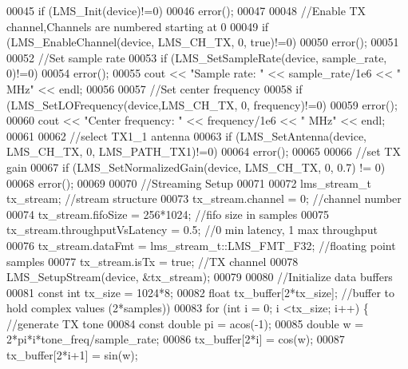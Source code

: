 \begin{DoxyCode}
00045     \textcolor{keywordflow}{if} (LMS_Init(device)!=0)
00046         error();
00047 
00048     \textcolor{comment}{//Enable TX channel,Channels are numbered starting at 0}
00049     \textcolor{keywordflow}{if} (LMS_EnableChannel(device, LMS_CH_TX, 0, \textcolor{keyword}{true})!=0)
00050         error();
00051 
00052     \textcolor{comment}{//Set sample rate}
00053     \textcolor{keywordflow}{if} (LMS_SetSampleRate(device, sample\_rate, 0)!=0)
00054         error();
00055     cout << \textcolor{stringliteral}{"Sample rate: "} << sample\_rate/1e6 << \textcolor{stringliteral}{" MHz"} << endl;
00056 
00057     \textcolor{comment}{//Set center frequency}
00058     \textcolor{keywordflow}{if} (LMS_SetLOFrequency(device,LMS_CH_TX, 0, frequency)!=0)
00059         error();
00060     cout << \textcolor{stringliteral}{"Center frequency: "} << frequency/1e6 << \textcolor{stringliteral}{" MHz"} << endl;
00061 
00062     \textcolor{comment}{//select TX1\_1 antenna}
00063     \textcolor{keywordflow}{if} (LMS_SetAntenna(device, LMS_CH_TX, 0, LMS_PATH_TX1)!=0)
00064         error();
00065 
00066     \textcolor{comment}{//set TX gain}
00067     \textcolor{keywordflow}{if} (LMS_SetNormalizedGain(device, LMS_CH_TX, 0, 0.7) != 0)
00068         error();
00069 
00070     \textcolor{comment}{//Streaming Setup}
00071 
00072     lms_stream_t tx\_stream;                 \textcolor{comment}{//stream structure}
00073     tx\_stream.channel = 0;                  \textcolor{comment}{//channel number}
00074     tx\_stream.fifoSize = 256*1024;          \textcolor{comment}{//fifo size in samples}
00075     tx\_stream.throughputVsLatency = 0.5;    \textcolor{comment}{//0 min latency, 1 max throughput}
00076     tx\_stream.dataFmt = lms_stream_t::LMS_FMT_F32; \textcolor{comment}{//floating point samples}
00077     tx\_stream.isTx = \textcolor{keyword}{true};                  \textcolor{comment}{//TX channel}
00078     LMS_SetupStream(device, &tx\_stream);
00079 
00080     \textcolor{comment}{//Initialize data buffers}
00081     \textcolor{keyword}{const} \textcolor{keywordtype}{int} tx\_size = 1024*8;
00082     \textcolor{keywordtype}{float} tx\_buffer[2*tx\_size];     \textcolor{comment}{//buffer to hold complex values (2*samples))}
00083     \textcolor{keywordflow}{for} (\textcolor{keywordtype}{int} i = 0; i <tx\_size; i++) \{      \textcolor{comment}{//generate TX tone}
00084         \textcolor{keyword}{const} \textcolor{keywordtype}{double} pi = acos(-1);
00085         \textcolor{keywordtype}{double} w = 2*pi*i*tone\_freq/sample\_rate;
00086         tx\_buffer[2*i] = cos(w);
00087         tx\_buffer[2*i+1] = sin(w);

\end{DoxyCode}
